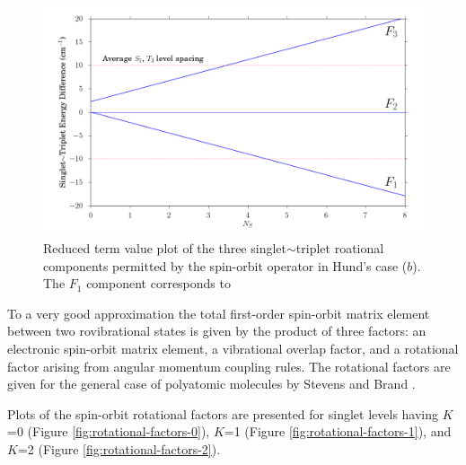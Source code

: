 \documentclass[12pt]{mitthesis}
\begin{document}
\begin{figure}
  \caption{ Reduced term value plot of the three singlet$\sim$triplet
    roational components permitted by the spin-orbit operator in
    Hund's case ($b$).  The $F_1$ component corresponds to  }
  \label{fig:components}
  \centering
  \includegraphics[width=6in]{f-components.png}
\end{figure}

To a very good approximation the total first-order spin-orbit matrix
element between two rovibrational states is given by the product of
three factors: an electronic spin-orbit matrix element, a vibrational
overlap factor, and a rotational factor arising from angular momentum
coupling rules.  The rotational factors are given for the general case
of polyatomic molecules by Stevens and Brand \cite{stevens73}.  

Plots of the spin-orbit rotational factors are presented for singlet
levels having $K$=0 (Figure \ref{fig:rotational-factors-0}), $K$=1
(Figure \ref{fig:rotational-factors-1}), and $K$=2 (Figure
\ref{fig:rotational-factors-2}).
\end{document}
